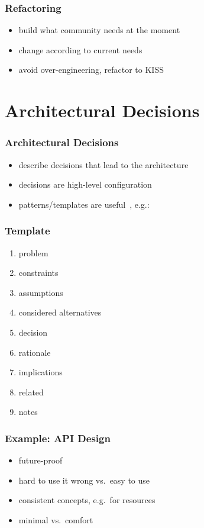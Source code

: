 \begin{frame}
	\frametitle{Refactoring}

	\begin{itemize}
	\item build what community needs at the moment
	\item change according to current needs
	\item avoid over-engineering, refactor to KISS
	\end{itemize}
\end{frame}


\section{Architectural Decisions}

\begin{frame}
	\frametitle{Architectural Decisions}
	\begin{itemize}[<+-| alert@+>]
	\item describe decisions that lead to the architecture
	\item decisions are high-level configuration
	\item patterns/templates are useful~\cite{zdun2007patterns}, e.g.:
	\end{itemize}
\end{frame}

\begin{frame}
	\frametitle{Template}
	\begin{enumerate}[<+-| alert@+>]
	\item problem
	\item constraints
	\item assumptions
	\item considered alternatives
	\item decision
	\item rationale
	\item implications
	\item related
	\item notes
	\end{enumerate}
\end{frame}

\begin{frame}
	\frametitle{Example: API Design}

	\begin{itemize}[<+-| alert@+>]
	\item future-proof
	\item hard to use it wrong vs.\ easy to use
	\item consistent concepts, e.g.\ for resources
	\item minimal vs.\ comfort
	\end{itemize}
\end{frame}

